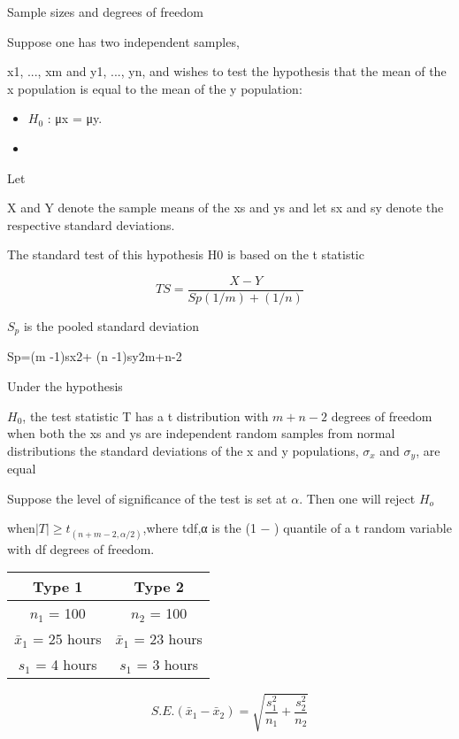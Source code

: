 \documentclass[]{report}
\begin{document}
Sample sizes and degrees of freedom


Suppose one has two independent samples,

x1, ..., xm and y1, ..., yn, and wishes
to test the hypothesis that the mean of the
x population is equal to the mean
of the y population:

\begin{itemize}
\item $H_0$ : μx = μy.
\item 
\end{itemize}

Let

X and Y denote the sample means of the xs and ys and let sx and sy
denote the respective standard deviations.

The standard test of this hypothesis
H0 is based on the t statistic

\[TS =\frac{X-Y}{Sp(1/m )+ (1/n)}\]


$S_p$ is the pooled standard deviation


Sp=(m -1)sx2+ (n -1)sy2m+n-2

Under the hypothesis

$H_0$, the test statistic T has a t distribution with $m+n−2$
degrees of freedom when both the xs and ys are independent random samples from normal distributions the standard deviations of the x and y populations, $\sigma_x$ and $\sigma_y$, are equal

Suppose the level of significance of the test is set at $\alpha$. Then one will reject $H_o$

when$|T| ≥ t_{(n+m−2,\alpha/2)}$,where tdf,α is the (1 − ) quantile of a t random variable with df degrees of
freedom.




\begin{center}
\begin{tabular}{|c||c|}
\hline 
Type 1 & Type 2 \\ \hline \hline
$n_1$ = 100 & $n_2$ = 100 \\ \hline
$\bar{x}_1$ = 25 hours & $\bar{x}_1$ = 23 hours \\ \hline
$s_1$ = 4 hours & $s_1$ = 3 hours \\ \hline
\end{tabular} 
\end{center}


\[ S.E.(\bar{x}_1 - \bar{x}_2)  = \sqrt{\frac{s^2_1}{n_1} + \frac{s^2_2}{n_2}}\]
\end{document}
